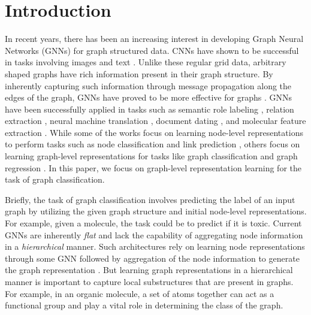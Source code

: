 \documentclass[letterpaper]{article} \usepackage{aaai20}  \usepackage{times}  \usepackage{helvet} \usepackage{courier}  \usepackage[hyphens]{url}  \usepackage{graphicx} \urlstyle{rm} \def\UrlFont{\rm}  \usepackage{graphicx}  \frenchspacing  \setlength{\pdfpagewidth}{8.5in}  \setlength{\pdfpageheight}{11in}
\begin{document}
\section{Introduction}
In recent years, there has been an increasing interest in developing Graph Neural Networks (GNNs) for graph structured data.  CNNs have shown to be successful in tasks involving images \cite{alex,resnet} and text \cite{conv-text}. Unlike these regular grid data, arbitrary shaped graphs have rich information present in their graph structure. By inherently capturing such information through message propagation along the edges of the graph, GNNs have proved to be more effective for graphs \cite{message_passing,sage}. GNNs have been successfully applied in tasks such as semantic role labeling \cite{gcn_srl}, relation extraction \cite{gcn_reside}, neural machine translation \cite{gcn_nmt}, document dating \cite{gcn_document}, and molecular feature extraction \cite{gcn_molecule}. While some of the works focus on learning node-level representations to perform tasks such as node classification \cite{gcn,gat} and link prediction \cite{rgcn,compgcn}, others focus on learning graph-level representations for tasks like graph classification \cite{spectral-gcn-1,spectral-gcn-2,diffpool,topk,sag} and graph regression \cite{cgcnn,mtcgcnn}. In this paper, we focus on graph-level representation learning for the task of graph classification.

Briefly, the task of graph classification involves predicting the label of an input graph by utilizing the given graph structure and initial node-level representations. For example, given a molecule, the task could be to predict if it is toxic. Current GNNs are inherently \emph{flat} and lack the capability of aggregating node information in a \emph{hierarchical} manner. Such architectures rely on learning node representations through some GNN followed by aggregation of the node information to generate the graph representation \cite{set2set,glob-att,sortpool}. But learning graph representations in a hierarchical manner is important to capture local substructures that are present in graphs. For example, in an organic molecule, a set of atoms together can act as a functional group and play a vital role in determining the class of the graph.
\end{document}
